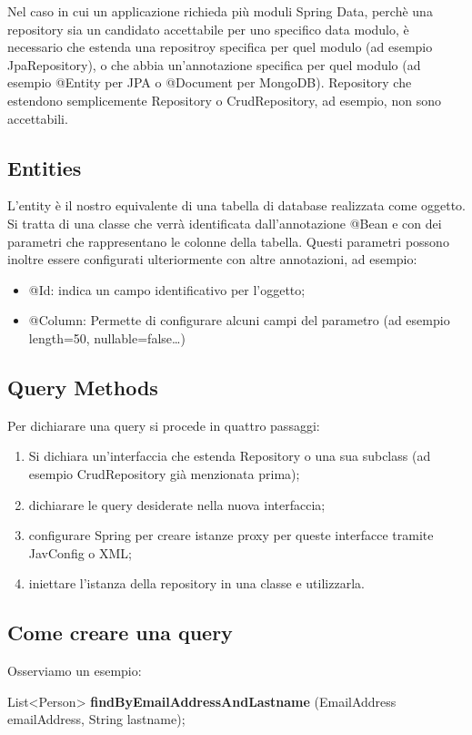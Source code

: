 Nel caso in cui un applicazione richieda più moduli Spring Data, perchè una repository sia un candidato accettabile per uno specifico data modulo, è necessario che estenda una repositroy specifica per quel modulo (ad esempio JpaRepository), o che abbia un'annotazione specifica per quel modulo (ad esempio @Entity per JPA o @Document per MongoDB). Repository che estendono semplicemente Repository o CrudRepository, ad esempio, non sono accettabili.

\subsection{Entities}
L'entity è il nostro equivalente di una tabella di database realizzata come oggetto. Si tratta di una classe che verrà identificata dall'annotazione @Bean e con dei parametri che rappresentano le colonne della tabella. Questi parametri possono inoltre essere configurati ulteriormente con altre annotazioni, ad esempio:
\begin{itemize}
    \item @Id: indica un campo identificativo per l'oggetto;
    \item @Column: Permette di configurare alcuni campi del parametro (ad esempio length=50, nullable=false\dots)
\end{itemize}

\subsection{Query Methods}
Per dichiarare una query si procede in quattro passaggi:
\begin{enumerate}
    \item Si dichiara un'interfaccia che estenda Repository o una sua subclass (ad esempio CrudRepository già menzionata prima);
    \item dichiarare le query desiderate nella nuova interfaccia;
    \item configurare Spring per creare istanze proxy per queste interfacce tramite JavConfig o XML;
    \item iniettare l'istanza della repository in una classe e utilizzarla.
\end{enumerate}

\subsection{Come creare una query}
Osserviamo un esempio:

List<Person> \textbf{findByEmailAddressAndLastname} (EmailAddress emailAddress, String lastname);

